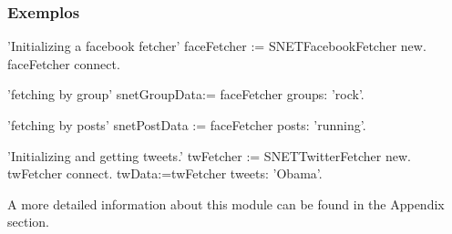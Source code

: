 \subsubsection{Exemplos}

\begin{godCode}
'Initializing a facebook fetcher'
faceFetcher := SNETFacebookFetcher new.
faceFetcher connect.

'fetching by group'
snetGroupData:= faceFetcher groups: 'rock'.

'fetching by posts'
snetPostData := faceFetcher posts: 'running'.

'Initializing and getting tweets.'
twFetcher := SNETTwitterFetcher new.
twFetcher connect.
twData:=twFetcher tweets: 'Obama'.

\end{godCode}

A more detailed information about this module can be found in the Appendix section.